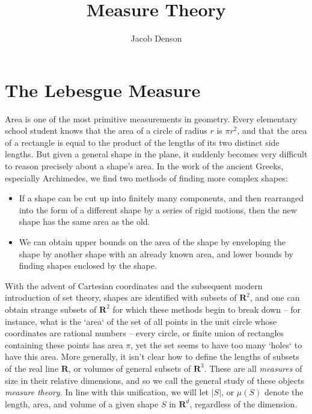 

\title{Measure Theory}
\author{Jacob Denson}




\maketitle

\tableofcontents


\chapter{The Lebesgue Measure}

Area is one of the most primitive measurements in geometry. Every elementary school student knows that the area of a circle of radius $r$ is $\pi r^2$, and that the area of a rectangle is equal to the product of the lengths of its two distinct side lengths. But given a general shape in the plane, it suddenly becomes very difficult to reason precisely about a shape's area. In the work of the ancient Greeks, especially Archimedes, we find two methods of finding more complex shapes:
%
\begin{itemize}
    \item If a shape can be cut up into finitely many components, and then rearranged into the form of a different shape by a series of rigid motions, then the new shape has the same area as the old.

    \item We can obtain upper bounds on the area of the shape by enveloping the shape by another shape with an already known area, and lower bounds by finding shapes enclosed by the shape.
\end{itemize}
%
With the advent of Cartesian coordinates and the subsequent modern introduction of set theory, shapes are identified with subsets of $\mathbf{R}^2$, and one can obtain strange subsets of $\mathbf{R}^2$ for which these methods begin to break down -- for instance, what is the `area` of the set of all points in the unit circle whose coordinates are rational numbers -- every circle, or finite union of rectangles containing these points has area $\pi$, yet the set seems to have too many `holes` to have this area. More generally, it isn't clear how to define the lengths of subsets of the real line $\mathbf{R}$, or volumes of general subsets of $\mathbf{R}^3$. These are all {\it measures} of size in their relative dimensions, and so we call the general study of these objects {\it measure theory}. In line with this unification, we will let $|S|$, or $\mu(S)$ denote the length, area, and volume of a given shape $S$ in $\mathbf{R}^d$, regardless of the dimension.

